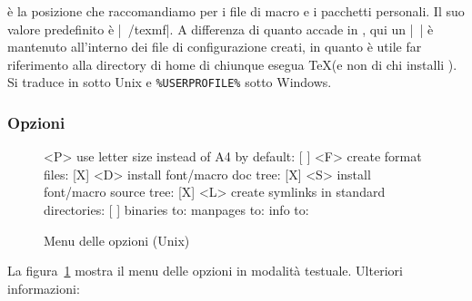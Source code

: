 \documentclass{article}
\begin{document}
 è la posizione che raccomandiamo per i file di macro e
i pacchetti personali. Il suo valore predefinito è |~/texmf|. A differenza
di quanto accade in , qui un |~| è mantenuto all'interno
dei file di configurazione creati, in quanto è utile far riferimento alla
directory di home di chiunque esegua \TeX (e non di chi installi \TL). Si
traduce in  sotto Unix e \verb|%USERPROFILE%| sotto
Windows.

\subsubsection{Opzioni}
\label{sec:options}

\begin{figure}[tbh]
\begin{boxedverbatim}
 <P> use letter size instead of A4 by default: [ ]
 <F> create format files:                      [X]
 <D> install font/macro doc tree:              [X]
 <S> install font/macro source tree:           [X]
 <L> create symlinks in standard directories:  [ ]
            binaries to:
            manpages to:
                info to:
\end{boxedverbatim}
\caption{Menu delle opzioni (Unix)}\label{fig:options-text}
\end{figure}

La figura~\ref{fig:options-text} mostra il menu delle opzioni in modalità
testuale. Ulteriori informazioni:
\end{document}
